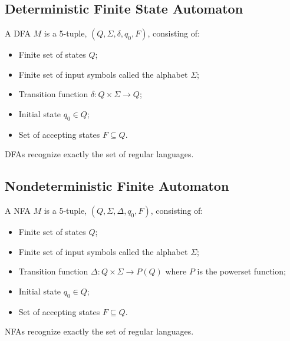 \documentclass{report}
\begin{document}
		\subsection{Deterministic Finite State Automaton}
			\begin{defn} \label{def_DFA} %
				A DFA $M$ is a 5-tuple, $(Q,\Sigma,\delta,q_0,F)$, consisting of:
				\begin{itemize}
					\item Finite set of states $Q$;
					\item Finite set of input symbols called the alphabet $\Sigma$;
					\item Transition function $\delta:Q \times \Sigma \rightarrow Q$;
					\item Initial state $q_0 \in Q$;
					\item Set of accepting states $F \subseteq Q$.
				\end{itemize}
			\end{defn}
		
			\begin{thm} \label{thm_DFA_RL}
				DFAs recognize exactly the set of regular languages.
			\end{thm}
		
		\subsection{Nondeterministic Finite Automaton}
			\begin{defn} \label{def_NFA} %
				A NFA $M$ is a 5-tuple, $(Q,\Sigma,\Delta,q_0,F)$, consisting of:
				\begin{itemize}
					\item Finite set of states $Q$;
					\item Finite set of input symbols called the alphabet $\Sigma$;
					\item Transition function $\Delta: Q \times \Sigma \rightarrow P(Q)$ where $P$ is the powerset function;
					\item Initial state $q_0 \in Q$;
					\item Set of accepting states $F \subseteq Q$.
				\end{itemize}
			\end{defn}
			
			\begin{thm} \label{thm_NFA_RL}
				NFAs recognize exactly the set of regular languages.
			\end{thm}
	
\end{document}
